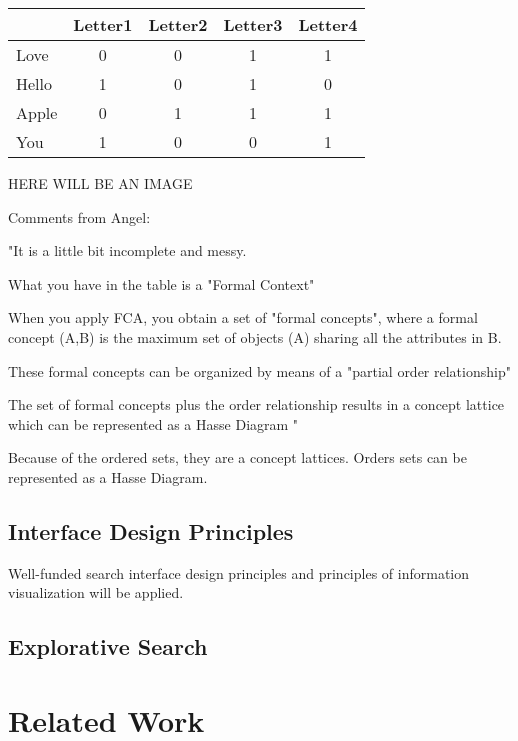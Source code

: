 \documentclass[11pt]{article}
\begin{document}
\begin{center}
\begin{tabular}{ l | c c c c}

  & Letter1 & Letter2 & Letter3 & Letter4\\
\hline

Love & 0 & 0 & 1 & 1\\
Hello & 1 & 0 & 1 & 0\\
Apple & 0 & 1 & 1 & 1\\
You & 1 & 0 & 0 & 1\\

\end{tabular}
\end{center}

HERE WILL BE AN IMAGE


Comments from Angel:


"It is a little bit incomplete and messy.

What you have in the table is a "Formal Context"

When you apply FCA, you obtain a set of "formal concepts", where a formal concept (A,B) is the maximum set of objects (A) sharing all the attributes in B.

These formal concepts can be organized by means of a "partial order relationship"

The set of formal concepts plus the order relationship results in a concept lattice which can be represented as a Hasse Diagram
"

Because of the ordered sets, they are a concept lattices. Orders sets can be represented as a Hasse Diagram. \cite{Ganter2012}

\subsection{Interface Design Principles}

Well-funded search interface design principles and principles of information visualization will be applied.\cite{Hearst2009,Shneiderman1996}

\blindtext

\subsection{Explorative Search}

\blindtext

\section{Related Work}
\end{document}
